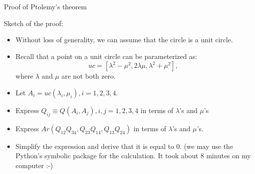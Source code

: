 \documentclass[10pt,ignorenonframetext,serif,onlymath]{beamer}
\providecommand{\tightlist}{%
  \setlength{\itemsep}{0pt}\setlength{\parskip}{0pt}}
\begin{document}
\begin{frame}{Proof of Ptolemy’s theorem}
\protect\hypertarget{sec:proof-of-ptolemys-theorem}{}

Sketch of the proof:

\begin{itemize}
\tightlist
\item
  Without loss of generality, we can assume that the circle is a unit
  circle.
\item
  Recall that a point on a unit circle can be parameterized as:
  \[uc = [\lambda^2 - \mu^2, 2 \lambda \mu, \lambda^2 + \mu^2],\] where
  \(\lambda\) and \(\mu\) are not both zero.
\item
  Let \(A_i = uc(\lambda_i, \mu_i), i = 1, 2, 3, 4\).
\item
  Express \(Q_{ij} \equiv Q(A_i, A_j), i,j=1,2,3,4\) in terms of
  \(\lambda\)’s and \(\mu\)’s
\item
  Express \(Ar(Q_{12}Q_{34},Q_{23}Q_{14},Q_{13}Q_{24})\) in terms of
  \(\lambda\)’s and \(\mu\)’s.
\item
  Simplify the expression and derive that it is equal to 0. (we may use
  the Python’s symbolic package for the calculation. It took about 8
  minutes on my computer :-)
\end{itemize}

\end{frame}
\end{document}
